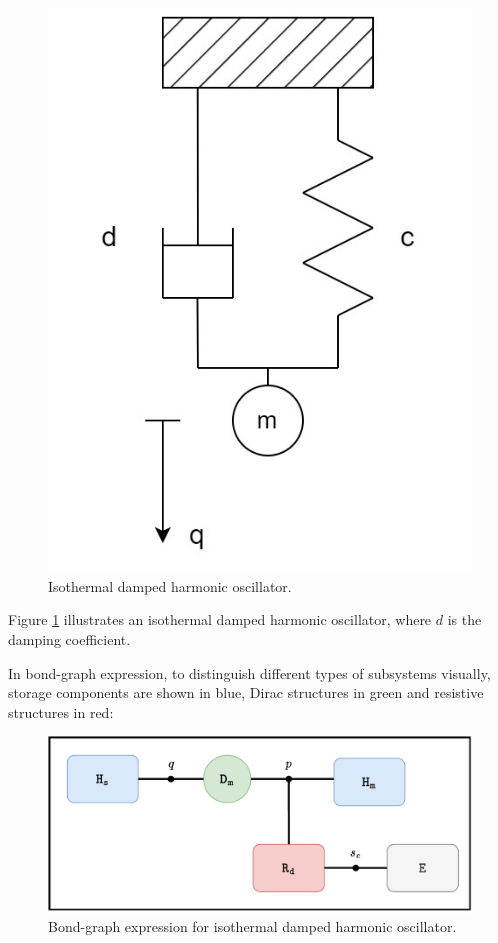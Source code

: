 \documentclass[
	parskip, 			   %
	twoside, 			   %
	DIV=14, 			   %
	BCOR=15.0mm, 		   %
	headsepline, 		   %
	open=right, 		   %
	captions=tableheading, %
	bibliography=totoc,    %
	numbers=noenddot       %
]{scrreprt}
\begin{document}
\clearpage
\begin{figure}[h!]
    \centering
    \includegraphics[scale=0.3]{figures/isothermal damped harmonic oscillator.jpg}
    \caption{Isothermal damped harmonic oscillator.}
    \label{fig:idho}
\end{figure}

Figure \ref{fig:idho} illustrates an isothermal damped harmonic oscillator, where $d$ is the damping coefficient.

In bond-graph expression, to distinguish different types of subsystems visually, storage components are shown in blue, Dirac structures in green and resistive structures in red:

\begin{figure}[h!]
    \centering
    \includegraphics[scale=0.6]{figures/bondgraph_idho_exergetic.pdf}
    \caption{Bond-graph expression for isothermal damped harmonic oscillator.}
    \label{fig:bondgraph_idho}
\end{figure}
\end{document}
